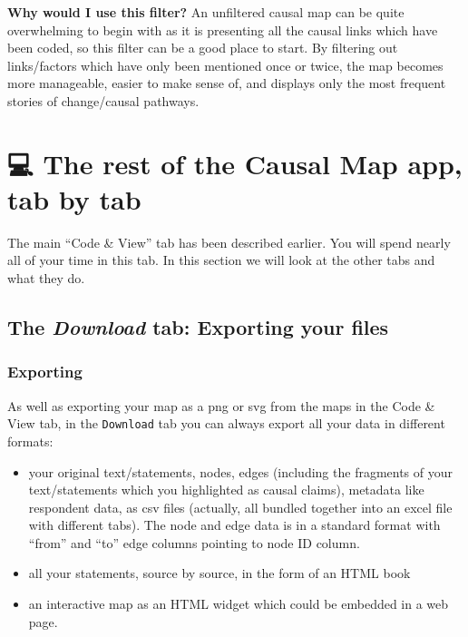 \documentclass[
]{book}
\providecommand{\tightlist}{%
  \setlength{\itemsep}{0pt}\setlength{\parskip}{0pt}}
\begin{document}
\textbf{Why would I use this filter?}
An unfiltered causal map can be quite overwhelming to begin with as it is presenting all the causal links which have been coded, so this filter can be a good place to start. By filtering out links/factors which have only been mentioned once or twice, the map becomes more manageable, easier to make sense of, and displays only the most frequent stories of change/causal pathways.

\hypertarget{restoftheapp}{%
\chapter{💻 The rest of the Causal Map app, tab by tab}\label{restoftheapp}}

The main ``Code \& View'' tab has been described earlier. You will spend nearly all of your time in this tab. In this section we will look at the other tabs and what they do.

\hypertarget{the-download-tab-exporting-your-files}{%
\section{\texorpdfstring{The \emph{Download} tab: Exporting your files}{The Download tab: Exporting your files}}\label{the-download-tab-exporting-your-files}}

\hypertarget{exporting}{%
\subsection{Exporting}\label{exporting}}

As well as exporting your map as a png or svg from the maps in the Code \& View tab, in the \texttt{Download} tab you can always export all your data in different formats:

\begin{itemize}
\tightlist
\item
  your original text/statements, nodes, edges (including the fragments of your text/statements which you highlighted as causal claims), metadata like respondent data, as csv files (actually, all bundled together into an excel file with different tabs). The node and edge data is in a standard format with ``from'' and ``to'' edge columns pointing to node ID column.
\item
  all your statements, source by source, in the form of an HTML book
\item
  an interactive map as an HTML widget which could be embedded in a web page.
\end{itemize}
\end{document}
